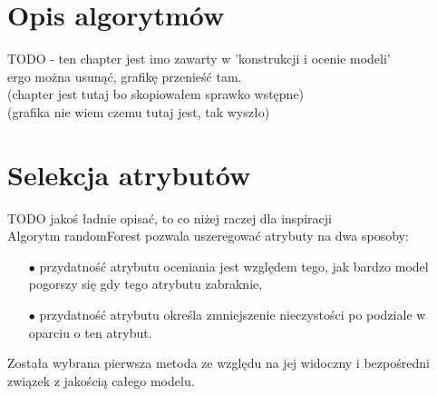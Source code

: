 \documentclass[a4paper,11pt,twoside]{mwrep}  %
\begin{document}
\begingroup
\let\clearpage\relax
\chapter{Opis algorytmów}


TODO - ten chapter jest imo zawarty w 'konstrukcji i ocenie modeli'\\
ergo można usunąć, grafikę przenieść tam.\\
(chapter jest tutaj bo skopiowałem sprawko wstępne)\\
(grafika nie wiem czemu tutaj jest, tak wyszło)\\

\begin{figure}[H]%
    \centering
    \label{FIG_1}%
\end{figure}

\endgroup



\begingroup
\let\clearpage\relax
\chapter{Selekcja atrybutów}

TODO jakoś ładnie opisać, to co niżej raczej dla inspiracji\\

Algorytm randomForest pozwala uszeregować atrybuty na dwa sposoby:
\begin{itemize}
\item[$\bullet$] przydatność atrybutu oceniania jest względem tego, jak bardzo model pogorszy się gdy tego atrybutu zabraknie,
\item[$\bullet$] przydatność atrybutu określa zmniejszenie nieczystości po podziale w oparciu o ten atrybut.
\end{itemize}
Została wybrana pierwsza metoda ze względu na jej widoczny i bezpośredni związek z jakością całego modelu.
\end{document}
